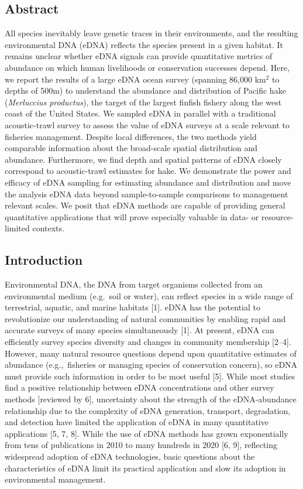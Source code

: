 \documentclass[
]{article}
\begin{document}
\hypertarget{abstract}{%
\subsection{Abstract}\label{abstract}}

All species inevitably leave genetic traces in their environments, and
the resulting environmental DNA (eDNA) reflects the species
present in a given habitat. It remains unclear whether eDNA
signals can provide quantitative metrics of abundance on which human livelihoods or conservation successes
depend. Here, we report the results of a large eDNA ocean survey 
(spanning 86,000 km\(^2\) to depths of 500m) to understand the
abundance and distribution of Pacific hake (\emph{Merluccius
productus}), the target of the largest finfish fishery along the west
coast of the United States. We sampled eDNA in parallel with a traditional acoustic-trawl 
survey to assess the value of eDNA surveys at a scale relevant to fisheries management. 
Despite local differences, the two methods yield comparable information
about the broad-scale spatial distribution and abundance.  Furthermore, we find depth and
spatial patterns of eDNA closely correspond to acoustic-trawl estimates for
hake. We demonstrate the power and efficacy of eDNA sampling for
estimating abundance and distribution and move the analysis eDNA data
beyond sample-to-sample comparisons to management relevant scales. We
posit that eDNA methods are capable of providing general quantitative 
applications that will prove especially valuable in data- or resource-limited contexts.

\pagebreak

\hypertarget{introduction}{%
\subsection{Introduction}\label{introduction}}

Environmental DNA, the DNA from target organisms collected from an
environmental medium (e.g.~soil or water), can reflect species in a wide
range of terrestrial, aquatic, and marine habitats {[}1{]}. eDNA has the
potential to revolutionize our understanding of natural communities by
enabling rapid and accurate surveys of many species simultaneously {[}1{]}. 
At present, eDNA can efficiently survey species diversity and changes in community membership {[}2--4{]}.
However, many natural resource questions depend upon quantitative estimates
of abundance (e.g.,~fisheries or managing species of conservation
concern), so eDNA must provide such information
in order to be most useful {[}5{]}. While most studies find a
positive relationship between eDNA concentrations and other survey
methods {[}reviewed by 6{]}, uncertainty about the strength of the
eDNA-abundance relationship due to the complexity of eDNA generation,
transport, degradation, and detection have limited the application of
eDNA in many quantitative applications {[}5, 7, 8{]}. While the use of eDNA
methods has grown exponentially from tens of publications in 2010 to
many hundreds in 2020 {[}6, 9{]}, reflecting widespread adoption of eDNA
technologies, basic questions about the characteristics of eDNA limit its
practical application and slow its adoption in environmental management.
\end{document}
